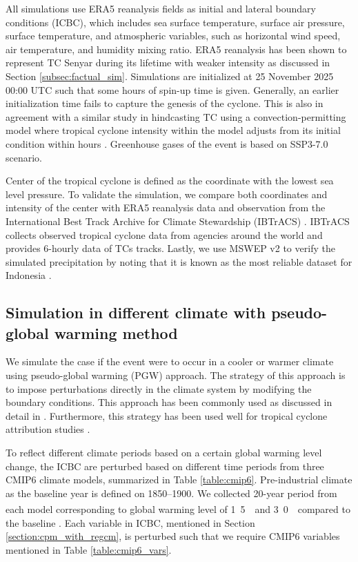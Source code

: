 \documentclass[journal abbreviation, manuscript]{copernicus}
\begin{document}
All simulations use ERA5 reanalysis fields \citep{hersbach2020era5} as initial and lateral boundary conditions (ICBC), which includes sea surface temperature, surface air pressure, surface temperature, and atmospheric variables, such as horizontal wind speed, air temperature, and humidity mixing ratio. ERA5 reanalysis has been shown to represent TC Senyar during its lifetime with weaker intensity as discussed in Section \ref{subsec:factual_sim}. Simulations are initialized at 25 November 2025 00:00 UTC such that some hours of spin-up time is given. Generally, an earlier initialization time fails to capture the genesis of the cyclone. This is also in agreement with a similar study in hindcasting TC using a convection-permitting model where tropical cyclone intensity within the model adjusts from its initial condition within hours \citep{patricola2018anthropogenic}. Greenhouse gases of the event is based on SSP3-7.0 scenario.

Center of the tropical cyclone is defined as the coordinate with the lowest sea level pressure. To validate the simulation, we compare both coordinates and intensity of the center with ERA5 reanalysis data and observation from the International Best Track Archive for Climate Stewardship (IBTrACS) \citep{knapp2010international, IBTrACS_data}. IBTrACS collects observed tropical cyclone data from agencies around the world and provides 6-hourly data of TCs tracks. Lastly, we use MSWEP v2 \citep{beck2019mswep} to verify the simulated precipitation by noting that it is known as the most reliable dataset for Indonesia \citep{wati2022statistics}.

\subsection{Simulation in different climate with pseudo-global warming method}

We simulate the case if the event were to occur in a cooler or warmer climate using pseudo-global warming (PGW) approach. The strategy of this approach is to impose perturbations directly in the climate system by modifying the boundary conditions. This approach has been commonly used as discussed in detail in \citet{brogli2023pseudo}. Furthermore, this strategy has been used well for tropical cyclone attribution studies \citep{patricola2018anthropogenic}.

To reflect different climate periods based on a certain global warming level change, the ICBC are perturbed based on different time periods from three CMIP6 climate models, summarized in Table \ref{table:cmip6}. Pre-industrial climate as the baseline year is defined on 1850--1900. We collected 20-year period from each model corresponding to global warming level of \unit{1.5\,^{\circ}} and \unit{3.0\,^{\circ}} compared to the baseline \citep{hauser2022transient}. Each variable in ICBC, mentioned in Section \ref{section:cpm_with_regcm}, is perturbed such that we require CMIP6 variables mentioned in Table \ref{table:cmip6_vars}.
\end{document}
